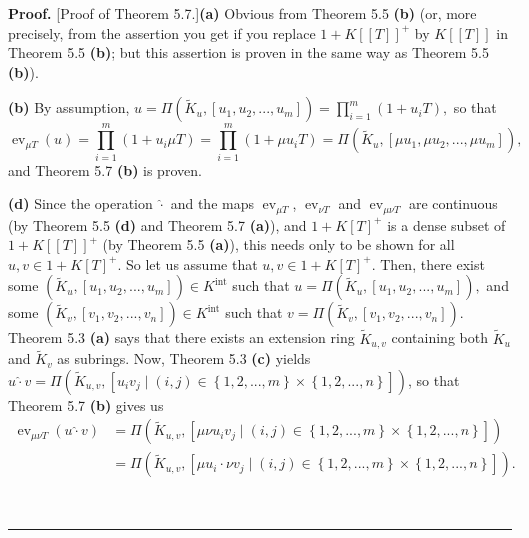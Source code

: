 \documentclass[numbers=enddot,12pt,final,onecolumn,notitlepage]{scrartcl}%
\newenvironment{proof}[1][Proof]{\noindent\textbf{#1.} }{\ \rule{0.5em}{0.5em}}
\begin{document}
\begin{proof}
[Proof of Theorem 5.7.]\textbf{(a)} Obvious from Theorem 5.5 \textbf{(b)} (or,
more precisely, from the assertion you get if you replace $1+K\left[  \left[
T\right]  \right]  ^{+}$ by $K\left[  \left[  T\right]  \right]  $ in Theorem
5.5 \textbf{(b)}; but this assertion is proven in the same way as Theorem 5.5
\textbf{(b)}).

\textbf{(b)} By assumption, $u=\Pi\left(  \widetilde{K}_{u},\left[
u_{1},u_{2},...,u_{m}\right]  \right)  =\prod\limits_{i=1}^{m}\left(
1+u_{i}T\right)  ,$ so that%
\[
\operatorname{ev}_{\mu T}\left(  u\right)  =\prod\limits_{i=1}^{m}\left(
1+u_{i}\mu T\right)  =\prod\limits_{i=1}^{m}\left(  1+\mu u_{i}T\right)
=\Pi\left(  \widetilde{K}_{u},\left[  \mu u_{1},\mu u_{2},...,\mu
u_{m}\right]  \right)  ,
\]
and Theorem 5.7 \textbf{(b)} is proven.

\textbf{(d)} Since the operation $\widehat{\cdot}$ and the maps
$\operatorname*{ev}_{\mu T}$, $\operatorname*{ev}_{\nu T}$ and
$\operatorname*{ev}_{\mu\nu T}$ are continuous (by Theorem 5.5 \textbf{(d)
}and Theorem 5.7 \textbf{(a)}), and $1+K\left[  T\right]  ^{+}$ is a dense
subset of $1+K\left[  \left[  T\right]  \right]  ^{+}$ (by Theorem 5.5
\textbf{(a)}), this needs only to be shown for all $u,v\in1+K\left[  T\right]
^{+}$. So let us assume that $u,v\in1+K\left[  T\right]  ^{+}$. Then, there
exist some $\left(  \widetilde{K}_{u},\left[  u_{1},u_{2},...,u_{m}\right]
\right)  \in K^{\operatorname*{int}}$ such that $u=\Pi\left(  \widetilde{K}%
_{u},\left[  u_{1},u_{2},...,u_{m}\right]  \right)  ,$ and some $\left(
\widetilde{K}_{v},\left[  v_{1},v_{2},...,v_{n}\right]  \right)  \in
K^{\operatorname*{int}}$ such that $v=\Pi\left(  \widetilde{K}_{v},\left[
v_{1},v_{2},...,v_{n}\right]  \right)  $. Theorem 5.3 \textbf{(a)} says that
there exists an extension ring $\widetilde{K}_{u,v}$ containing both
$\widetilde{K}_{u}$ and $\widetilde{K}_{v}$ as subrings. Now, Theorem 5.3
\textbf{(c)} yields $u\widehat{\cdot}v=\Pi\left(  \widetilde{K}_{u,v},\left[
u_{i}v_{j}\mid\left(  i,j\right)  \in\left\{  1,2,...,m\right\}
\times\left\{  1,2,...,n\right\}  \right]  \right)  $, so that Theorem 5.7
\textbf{(b)} gives us%
\begin{align*}
\operatorname*{ev}\nolimits_{\mu\nu T}\left(  u\widehat{\cdot}v\right)   &
=\Pi\left(  \widetilde{K}_{u,v},\left[  \mu\nu u_{i}v_{j}\mid\left(
i,j\right)  \in\left\{  1,2,...,m\right\}  \times\left\{  1,2,...,n\right\}
\right]  \right) \\
&  =\Pi\left(  \widetilde{K}_{u,v},\left[  \mu u_{i}\cdot\nu v_{j}\mid\left(
i,j\right)  \in\left\{  1,2,...,m\right\}  \times\left\{  1,2,...,n\right\}
\right]  \right)  .
\end{align*}



\end{proof}
\end{document}
